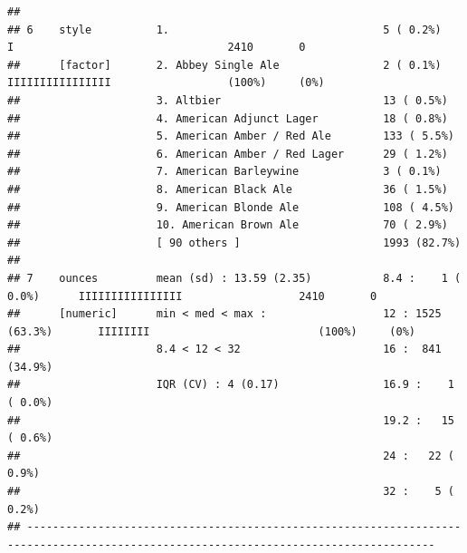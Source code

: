 \documentclass[]{article}
\begin{document}
\begin{verbatim}
## 
## 6    style          1.                                 5 ( 0.2%)               I                                 2410       0        
##      [factor]       2. Abbey Single Ale                2 ( 0.1%)               IIIIIIIIIIIIIIII                  (100%)     (0%)     
##                     3. Altbier                         13 ( 0.5%)                                                                    
##                     4. American Adjunct Lager          18 ( 0.8%)                                                                    
##                     5. American Amber / Red Ale        133 ( 5.5%)                                                                   
##                     6. American Amber / Red Lager      29 ( 1.2%)                                                                    
##                     7. American Barleywine             3 ( 0.1%)                                                                     
##                     8. American Black Ale              36 ( 1.5%)                                                                    
##                     9. American Blonde Ale             108 ( 4.5%)                                                                   
##                     10. American Brown Ale             70 ( 2.9%)                                                                    
##                     [ 90 others ]                      1993 (82.7%)                                                                  
## 
## 7    ounces         mean (sd) : 13.59 (2.35)           8.4 :    1 ( 0.0%)      IIIIIIIIIIIIIIII                  2410       0        
##      [numeric]      min < med < max :                  12 : 1525 (63.3%)       IIIIIIII                          (100%)     (0%)     
##                     8.4 < 12 < 32                      16 :  841 (34.9%)                                                             
##                     IQR (CV) : 4 (0.17)                16.9 :    1 ( 0.0%)                                                           
##                                                        19.2 :   15 ( 0.6%)                                                           
##                                                        24 :   22 ( 0.9%)                                                             
##                                                        32 :    5 ( 0.2%)                                                             
## -------------------------------------------------------------------------------------------------------------------------------------
\end{verbatim}
\end{document}
